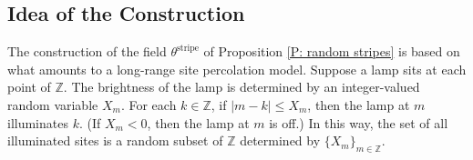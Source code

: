 \documentclass[10pt,a4paper]{amsart}
\begin{document}
%	
	
\subsection{Idea of the Construction} The construction of the field $\theta^{\text{stripe}}$ of Proposition \ref{P: random stripes} is based on what amounts to a long-range site percolation model.  Suppose a lamp sits at each point of $\mathbb{Z}$.  The brightness of the lamp is determined by an integer-valued random variable $X_{m}$.  For each $k \in \mathbb{Z}$, if $|m - k| \leq X_{m}$, then the lamp at $m$ illuminates $k$.  (If $X_{m} < 0$, then the lamp at $m$ is off.)  In this way, the set of all illuminated sites is a random subset of $\mathbb{Z}$ determined by $\{X_{m}\}_{m \in \mathbb{Z}}$.  
\end{document}

